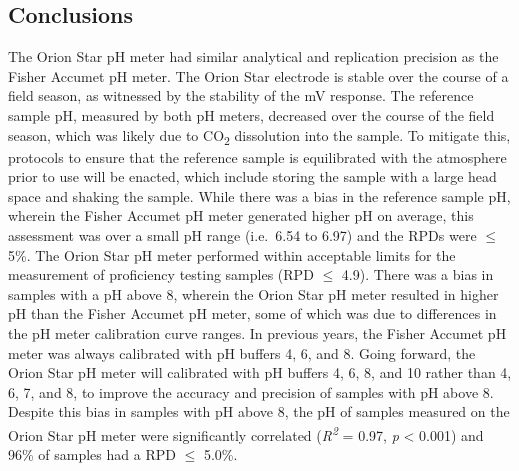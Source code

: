\documentclass[
]{article}
\begin{document}
\subsection{Conclusions}

The Orion Star pH meter had similar analytical and replication precision
as the Fisher Accumet pH meter. The Orion Star electrode is stable over
the course of a field season, as witnessed by the stability of the mV
response. The reference sample pH, measured by both pH meters, decreased
over the course of the field season, which was likely due to
CO\textsubscript{2} dissolution into the sample. To mitigate this,
protocols to ensure that the reference sample is equilibrated with the
atmosphere prior to use will be enacted, which include storing the
sample with a large head space and shaking the sample. While there was a
bias in the reference sample pH, wherein the Fisher Accumet pH meter
generated higher pH on average, this assessment was over a small pH
range (i.e.~6.54 to 6.97) and the RPDs were \(\leq\) 5\%. The Orion Star
pH meter performed within acceptable limits for the measurement of
proficiency testing samples (RPD \(\leq\) 4.9). There was a bias in
samples with a pH above 8, wherein the Orion Star pH meter resulted in
higher pH than the Fisher Accumet pH meter, some of which was due to
differences in the pH meter calibration curve ranges. In previous years,
the Fisher Accumet pH meter was always calibrated with pH buffers 4, 6,
and 8. Going forward, the Orion Star pH meter will calibrated with pH
buffers 4, 6, 8, and 10 rather than 4, 6, 7, and 8, to improve the
accuracy and precision of samples with pH above 8. Despite this bias in
samples with pH above 8, the pH of samples measured on the Orion Star pH
meter were significantly correlated (\emph{R\textsuperscript{2}} = 0.97,
\emph{p} \textless{} 0.001) and 96\% of samples had a RPD \(\leq\)
5.0\%.
\end{document}
